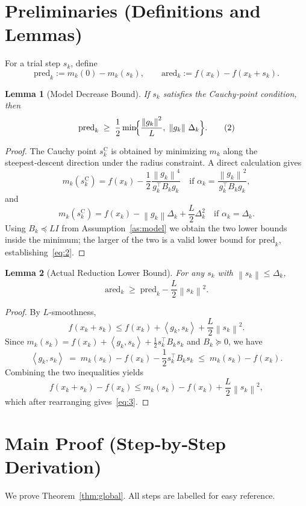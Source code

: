 \documentclass{article}
\newcommand{\norm}[1]{\left\lVert #1 \right\rVert}
\newcommand{\inner}[1]{\left\langle #1 \right\rangle}
\newtheorem{lemma}{Lemma}
\begin{document}
\newpage
\section*{Preliminaries (Definitions and Lemmas)}
\begin{definition}
For a trial step $s_k$, define
\[
\text{pred}_k:=m_k(0)-m_k(s_k),\qquad
\text{ared}_k:=f(x_k)-f(x_k+s_k).
\]
\end{definition}
\begin{lemma}[Model Decrease Bound]\label{lem:pred}
If $s_k$ satisfies the Cauchy‑point condition, then
\[
\text{pred}_k\;\ge\;\frac{1}{2}\min\!\Bigl\{\frac{\norm{g_k}^2}{L},\; \norm{g_k}\,\Delta_k\Bigr\}.
\tag{2}
\]
\end{lemma}
\begin{proof}
The Cauchy point $s^{\mathrm{C}}_k$ is obtained by minimizing $m_k$ along the steepest‑descent direction under the radius constraint.  
A direct calculation gives
\[
m_k(s^{\mathrm{C}}_k)=
f(x_k)-\frac{1}{2}\frac{\norm{g_k}^4}{g_k^{\!\top}B_k g_k}\quad\text{if }\alpha_k=\frac{\norm{g_k}^2}{g_k^{\!\top}B_k g_k},
\]
and
\[
m_k(s^{\mathrm{C}}_k)=
f(x_k)-\norm{g_k}\Delta_k+\frac{L}{2}\Delta_k^2\quad\text{if }\alpha_k=\Delta_k.
\]
Using $B_k\preceq L I$ from Assumption~\ref{as:model} we obtain the two lower bounds inside the minimum; the larger of the two is a valid lower bound for $\text{pred}_k$, establishing~\eqref{eq:2}. \qedhere
\end{proof}

\begin{lemma}[Actual Reduction Lower Bound]\label{lem:ared}
For any $s_k$ with $\norm{s_k}\le\Delta_k$,
\[
\text{ared}_k\;\ge\;\text{pred}_k - \frac{L}{2}\norm{s_k}^2 .
\tag{3}
\]
\end{lemma}
\begin{proof}
By $L$‑smoothness,
\[
f(x_k+s_k)\le f(x_k)+\inner{g_k,s_k}+\frac{L}{2}\norm{s_k}^2 .
\]
Since $m_k(s_k)=f(x_k)+\inner{g_k,s_k}+\frac12 s_k^{\!\top}B_k s_k$ and $B_k\succeq 0$, we have
\[
\inner{g_k,s_k}\;=\;m_k(s_k)-f(x_k)-\frac12 s_k^{\!\top}B_k s_k
\;\le\;m_k(s_k)-f(x_k).
\]
Combining the two inequalities yields
\[
f(x_k+s_k)-f(x_k)\le m_k(s_k)-f(x_k)+\frac{L}{2}\norm{s_k}^2,
\]
which after rearranging gives~\eqref{eq:3}. \qedhere
\end{proof}

\section*{Main Proof (Step‑by‑Step Derivation)}
We prove Theorem~\ref{thm:global}.  All steps are labelled for easy reference.
\end{document}
